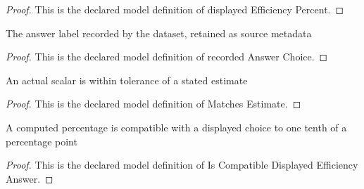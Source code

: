 \begin{proof}
  This is the declared model definition of displayed Efficiency Percent.
\end{proof}
\begin{definition}
  \label{def:physics:phyx-mini-0354:phyxminiproblems-problemphyxmini0354-recordedanswerchoice}
  The answer label recorded by the dataset, retained as source metadata
\end{definition}
\begin{proof}
  This is the declared model definition of recorded Answer Choice.
\end{proof}
\begin{definition}
  \label{def:physics:phyx-mini-0354:phyxminiproblems-problemphyxmini0354-matchesestimate}
  An actual scalar is within tolerance of a stated estimate
\end{definition}
\begin{proof}
  This is the declared model definition of Matches Estimate.
\end{proof}
\begin{definition}
  \label{def:physics:phyx-mini-0354:phyxminiproblems-problemphyxmini0354-iscompatibledisplayedefficiencyanswer}
  A computed percentage is compatible with a displayed choice to one tenth of a percentage point
\end{definition}
\begin{proof}
  This is the declared model definition of Is Compatible Displayed Efficiency Answer.
\end{proof}
